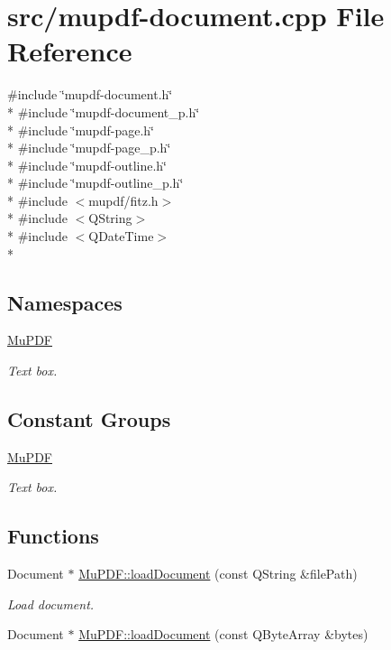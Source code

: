 \hypertarget{mupdf-document_8cpp}{\section{src/mupdf-\/document.cpp File Reference}
\label{mupdf-document_8cpp}
}
{\ttfamily \#include \char`\"{}mupdf-\/document.\-h\char`\"{}}\\*
{\ttfamily \#include \char`\"{}mupdf-\/document\-\_\-p.\-h\char`\"{}}\\*
{\ttfamily \#include \char`\"{}mupdf-\/page.\-h\char`\"{}}\\*
{\ttfamily \#include \char`\"{}mupdf-\/page\-\_\-p.\-h\char`\"{}}\\*
{\ttfamily \#include \char`\"{}mupdf-\/outline.\-h\char`\"{}}\\*
{\ttfamily \#include \char`\"{}mupdf-\/outline\-\_\-p.\-h\char`\"{}}\\*
{\ttfamily \#include $<$mupdf/fitz.\-h$>$}\\*
{\ttfamily \#include $<$Q\-String$>$}\\*
{\ttfamily \#include $<$Q\-Date\-Time$>$}\\*
\subsection*{Namespaces}
\begin{DoxyCompactItemize}
\item 
\hyperlink{namespace_mu_p_d_f}{Mu\-P\-D\-F}
\begin{DoxyCompactList}\small\item\em Text box. \end{DoxyCompactList}\end{DoxyCompactItemize}
\subsection*{Constant Groups}
\begin{DoxyCompactItemize}
\item 
\hyperlink{namespace_mu_p_d_f}{Mu\-P\-D\-F}
\begin{DoxyCompactList}\small\item\em Text box. \end{DoxyCompactList}\end{DoxyCompactItemize}
\subsection*{Functions}
\begin{DoxyCompactItemize}
\item 
Document $\ast$ \hyperlink{namespace_mu_p_d_f_a5cf746094bc9648aca0d4a83e3ac44b3}{Mu\-P\-D\-F\-::load\-Document} (const Q\-String \&file\-Path)
\begin{DoxyCompactList}\small\item\em Load document. \end{DoxyCompactList}\item 
Document $\ast$ \hyperlink{namespace_mu_p_d_f_a294a09188a3dcab290679752dfc8d52b}{Mu\-P\-D\-F\-::load\-Document} (const Q\-Byte\-Array \&bytes)
\end{DoxyCompactItemize}
